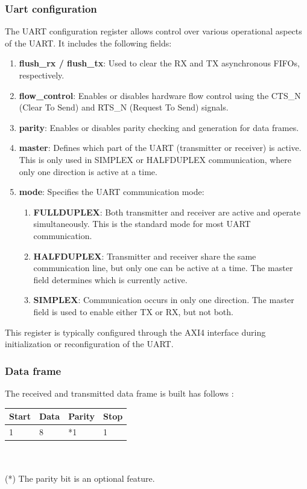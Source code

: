 \documentclass[12pt]{article}
\begin{document}
\subsubsection{Uart configuration}
The UART configuration register allows control over various operational 
aspects of the UART. It includes the following fields:
\begin{enumerate}
\item \textbf{flush\_rx / flush\_tx}: Used to clear the RX and TX asynchronous FIFOs, 
      respectively.
\item \textbf{flow\_control}: Enables or disables hardware flow control using the CTS\_N 
      (Clear To Send) and RTS\_N  (Request To Send) signals.
\item \textbf{parity}: Enables or disables parity checking and generation for data frames.
\item \textbf{master}: Defines which part of the UART (transmitter or receiver) is active. 
      This is only used in SIMPLEX or HALFDUPLEX communication, where only one direction is 
      active at a time.
\item \textbf{mode}: Specifies the UART communication mode:
      \begin{enumerate}
        \item \textbf{FULLDUPLEX}: Both transmitter and receiver are active and operate simultaneously. 
              This is the standard mode for most UART communication.
        \item \textbf{HALFDUPLEX}: Transmitter and receiver share the same communication line, but only 
              one can be active at a time. The master field determines which is currently active.
        \item \textbf{SIMPLEX}: Communication occurs in only one direction. The master field is used 
              to enable either TX or RX, but not both.
      \end{enumerate}
\end{enumerate}
This register is typically configured through the AXI4 interface during initialization or reconfiguration of the UART.
\subsubsection{Data frame}
The received and transmitted data frame is built has follows : \\

\noindent \begin{tabular}{|p{3cm}|p{3cm}|p{3cm}|p{3cm}|}
  \hline
  \rowcolor{light-gray}\textbf{Start} & \textbf{Data} & \textbf{Parity} & \textbf{Stop} \\
  \hline
  1 & 8 & *1  & 1 \\
  \hline
\end{tabular} \\~\\
\noindent (*) The parity bit is an optional feature.
\end{document}
